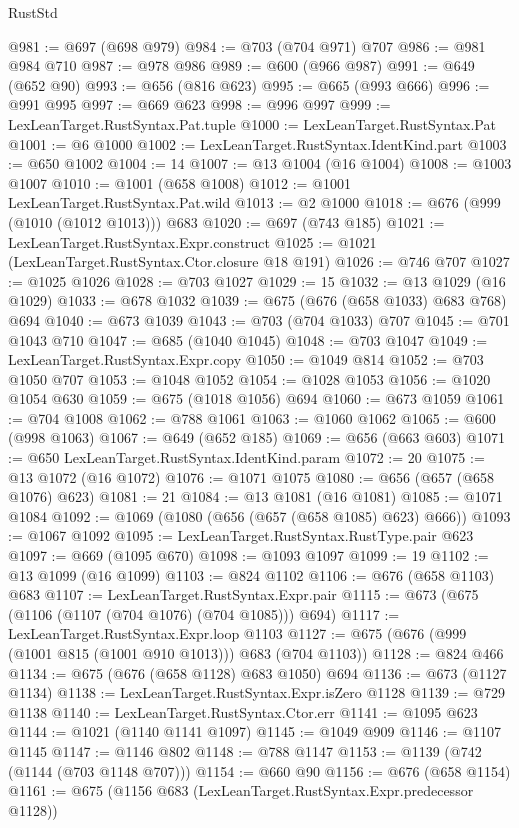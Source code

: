 \begin{lexlean}{RustStd}
\begin{coremodule}
@981 := @697 (@698 @979)
@984 := @703 (@704 @971) @707
@986 := @981 @984 @710
@987 := @978 @986
@989 := @600 (@966 @987)
@991 := @649 (@652 @90)
@993 := @656 (@816 @623)
@995 := @665 (@993 @666)
@996 := @991 @995
@997 := @669 @623
@998 := @996 @997
@999 := LexLeanTarget.RustSyntax.Pat.tuple
@1000 := LexLeanTarget.RustSyntax.Pat
@1001 := @6 @1000
@1002 := LexLeanTarget.RustSyntax.IdentKind.part
@1003 := @650 @1002
@1004 := 14
@1007 := @13 @1004 (@16 @1004)
@1008 := @1003 @1007
@1010 := @1001 (@658 @1008)
@1012 := @1001 LexLeanTarget.RustSyntax.Pat.wild
@1013 := @2 @1000
@1018 := @676 (@999 (@1010 (@1012 @1013))) @683
@1020 := @697 (@743 @185)
@1021 := LexLeanTarget.RustSyntax.Expr.construct
@1025 := @1021 (LexLeanTarget.RustSyntax.Ctor.closure @18 @191)
@1026 := @746 @707
@1027 := @1025 @1026
@1028 := @703 @1027
@1029 := 15
@1032 := @13 @1029 (@16 @1029)
@1033 := @678 @1032
@1039 := @675 (@676 (@658 @1033) @683 @768) @694
@1040 := @673 @1039
@1043 := @703 (@704 @1033) @707
@1045 := @701 @1043 @710
@1047 := @685 (@1040 @1045)
@1048 := @703 @1047
@1049 := LexLeanTarget.RustSyntax.Expr.copy
@1050 := @1049 @814
@1052 := @703 @1050 @707
@1053 := @1048 @1052
@1054 := @1028 @1053
@1056 := @1020 @1054 @630
@1059 := @675 (@1018 @1056) @694
@1060 := @673 @1059
@1061 := @704 @1008
@1062 := @788 @1061
@1063 := @1060 @1062
@1065 := @600 (@998 @1063)
@1067 := @649 (@652 @185)
@1069 := @656 (@663 @603)
@1071 := @650 LexLeanTarget.RustSyntax.IdentKind.param
@1072 := 20
@1075 := @13 @1072 (@16 @1072)
@1076 := @1071 @1075
@1080 := @656 (@657 (@658 @1076) @623)
@1081 := 21
@1084 := @13 @1081 (@16 @1081)
@1085 := @1071 @1084
@1092 := @1069 (@1080 (@656 (@657 (@658 @1085) @623) @666))
@1093 := @1067 @1092
@1095 := LexLeanTarget.RustSyntax.RustType.pair @623
@1097 := @669 (@1095 @670)
@1098 := @1093 @1097
@1099 := 19
@1102 := @13 @1099 (@16 @1099)
@1103 := @824 @1102
@1106 := @676 (@658 @1103) @683
@1107 := LexLeanTarget.RustSyntax.Expr.pair
@1115 := @673 (@675 (@1106 (@1107 (@704 @1076) (@704 @1085))) @694)
@1117 := LexLeanTarget.RustSyntax.Expr.loop @1103
@1127 := @675 (@676 (@999 (@1001 @815 (@1001 @910 @1013))) @683 (@704 @1103))
@1128 := @824 @466
@1134 := @675 (@676 (@658 @1128) @683 @1050) @694
@1136 := @673 (@1127 @1134)
@1138 := LexLeanTarget.RustSyntax.Expr.isZero @1128
@1139 := @729 @1138
@1140 := LexLeanTarget.RustSyntax.Ctor.err
@1141 := @1095 @623
@1144 := @1021 (@1140 @1141 @1097)
@1145 := @1049 @909
@1146 := @1107 @1145
@1147 := @1146 @802
@1148 := @788 @1147
@1153 := @1139 (@742 (@1144 (@703 @1148 @707)))
@1154 := @660 @90
@1156 := @676 (@658 @1154)
@1161 := @675 (@1156 @683 (LexLeanTarget.RustSyntax.Expr.predecessor @1128))

\end{coremodule}
\end{lexlean}
